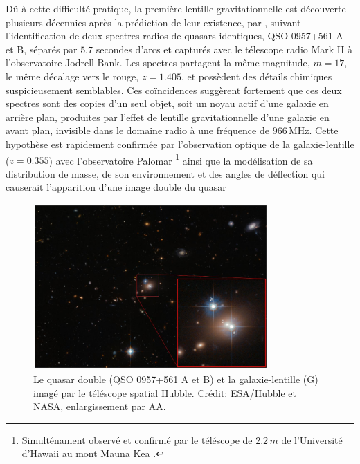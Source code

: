 Dû à cette difficulté pratique, 
la première lentille gravitationnelle est découverte plusieurs décennies après la prédiction de leur existence, par \citet{Walsh1979}, 
suivant l'identification de deux spectres radios de quasars identiques, QSO 0957+561 A et B, séparés par $5.7$ secondes d'arcs
et capturés avec le télescope radio Mark II à l'observatoire Jodrell Bank. 
Les spectres partagent la même magnitude, $m=17$, le même décalage vers le rouge, $z=1.405$, et possèdent des détails 
chimiques suspicieusement semblables. Ces coïncidences suggèrent fortement que ces deux spectres sont des copies d'un seul objet, soit un noyau 
actif d'une galaxie en arrière plan, produites par l'effet de lentille gravitationnelle d'une galaxie en avant plan, invisible dans le 
domaine radio à une fréquence de $966\,\mathrm{MHz}$. Cette hypothèse est rapidement confirmée par 
l'observation optique de la galaxie-lentille ($z=0.355$) avec l'observatoire Palomar \citep{Young1980}\footnote{Simulténament 
observé et confirmé par le téléscope de $2.2\, m$ de l'Université d'Hawaii au mont Mauna Kea \citep{Stockton1980}.} 
ainsi que la modélisation de sa distribution de masse, de son environnement 
et des angles de déflection qui causerait l'apparition d'une image double du quasar \citep{Young1981,Falco1991}
\begin{figure}[tb!]
        \centering
        \includegraphics[width=0.8\textwidth]{figures/zoomed_in_qso0957}
        \caption{Le quasar double (QSO 0957+561 A et B) et la galaxie-lentille (G) imagé par le téléscope spatial Hubble. 
        Crédit: ESA/Hubble et NASA, enlargissement par AA.}
        \label{fig:doubel quasar}
\end{figure}

